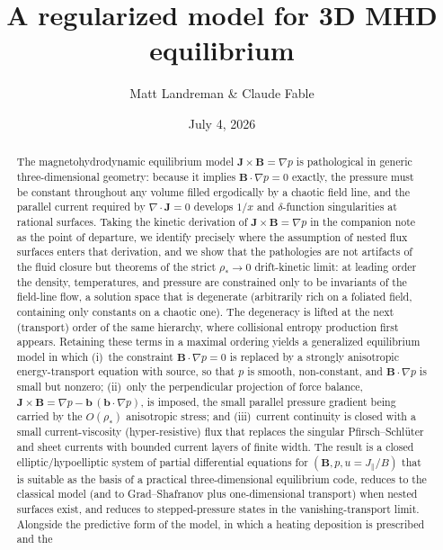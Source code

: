 \documentclass[english]{article}
\newcommand{\bB}{\mathbf{B}}
\newcommand{\bJ}{\mathbf{J}}
\newcommand{\bb}{\mathbf{b}}
\begin{document}
\title{A regularized model for 3D MHD equilibrium}
\author{Matt Landreman \& Claude Fable}
\date{July 4, 2026}
\maketitle

\begin{abstract}
The magnetohydrodynamic equilibrium model $\bJ\times\bB=\nabla p$ is pathological in generic
three-dimensional geometry: because it implies $\bB\cdot\nabla p=0$ exactly, the pressure must be
constant throughout any volume filled ergodically by a chaotic field line, and the parallel current
required by $\nabla\cdot\bJ=0$ develops $1/x$ and $\delta$-function singularities at rational
surfaces. Taking the kinetic derivation of $\bJ\times\bB=\nabla p$ in the companion
note~\cite{landreman_note} as the point of departure, we identify precisely where the assumption
of nested flux surfaces enters that derivation, and we show that the pathologies are not artifacts
of the fluid closure but theorems of the strict $\rho_*\rightarrow0$ drift-kinetic limit: at
leading order the density, temperatures, and pressure are constrained only to be invariants of the
field-line flow, a solution space that is degenerate (arbitrarily rich on a foliated field,
containing only constants on a chaotic one). The degeneracy is lifted at the next (transport) order
of the same hierarchy, where collisional entropy production first appears. Retaining these terms in
a maximal ordering yields a generalized equilibrium model in which (i)~the constraint
$\bB\cdot\nabla p=0$ is replaced by a strongly anisotropic energy-transport equation with source,
so that $p$ is smooth, non-constant, and $\bB\cdot\nabla p$ is small but nonzero; (ii)~only the
perpendicular projection of force balance, $\bJ\times\bB=\nabla p-\bb\,(\bb\cdot\nabla p)$, is
imposed, the small parallel pressure gradient being carried by the $O(\rho_*)$ anisotropic stress;
and (iii)~current continuity is closed with a small current-viscosity (hyper-resistive) flux that
replaces the singular Pfirsch--Schl\"uter and sheet currents with bounded current layers of finite
width. The result is a closed elliptic/hypoelliptic system of partial differential equations for
$(\bB,p,u=J_\parallel/B)$ that is suitable as the basis of a practical three-dimensional equilibrium
code, reduces to the classical model (and to Grad--Shafranov plus one-dimensional transport) when
nested surfaces exist, and reduces to stepped-pressure states in the vanishing-transport limit.
Alongside the predictive form of the model, in which a heating deposition is prescribed and the

\end{abstract}
\end{document}
